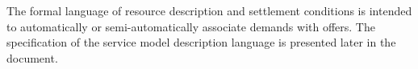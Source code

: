 The formal language of resource description and settlement conditions is intended to automatically or semi-automatically associate demands with offers.
The specification of the service model description language is presented later in the document.

\newpage



